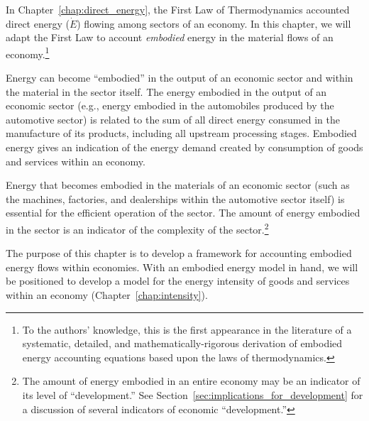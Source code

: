


In Chapter~\ref{chap:direct_energy}, the 
First Law of Thermodynamics
accounted direct energy ($\dot{E}$) flowing among sectors of an economy.
In this chapter, we will adapt the First Law to account  
\emph{embodied} energy
in the material flows of 
an economy.\footnote{To the authors' knowledge, 
	this is the first appearance in the literature 
	of a systematic, detailed, and mathematically-rigorous derivation 
	of embodied energy accounting equations based upon the 
	laws of thermodynamics.}

Energy can become ``embodied'' in the output of an economic sector
and within the material in the sector itself.
The energy embodied in the output of an economic sector 
(e.g., energy embodied in the automobiles produced by the automotive sector)
is related to the sum of all direct energy
consumed in the manufacture of its products, 
including all upstream processing stages. 
Embodied energy gives an indication 
of the energy demand created by consumption of goods and services
within an economy.

Energy that becomes embodied in the materials of an economic sector 
(such as the machines, factories, and dealerships 
within the automotive sector itself) is essential for 
the efficient operation of the sector. The amount of energy
embodied in the sector is an indicator of the complexity of
the sector.\footnote{The amount of energy embodied in an entire economy
	may be an indicator of its level of 
	``development.''
	See Section~\ref{sec:implications_for_development} for a
	discussion of several indicators of economic ``development.''}

The purpose of this chapter is to develop a framework for accounting
embodied energy flows within economies. 
With an embodied energy model in hand, we will be positioned
to develop a model for the energy intensity 
of goods and services within an economy 
(Chapter~\ref{chap:intensity}).


